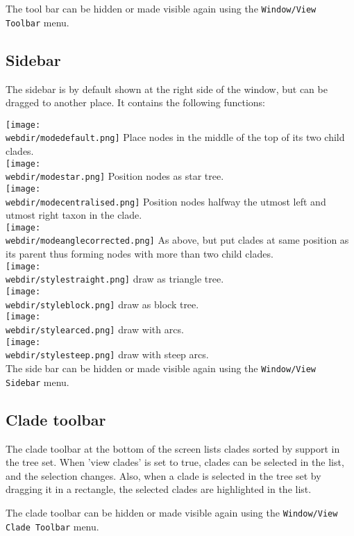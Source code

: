 \documentclass{article}
\def\webdir{/Users/remco/research/DensiTree/web}
\begin{document}
The tool bar can be hidden or made visible again using the {\tt Window/View Toolbar} menu.

\subsection{Sidebar}
The sidebar is by default shown at the right side of the window, but can be dragged to another place.
It contains the following functions:

\texttt{[image: \\webdir/modedefault.png]} Place nodes in the middle of the top of its two child clades.\\
\texttt{[image: \\webdir/modestar.png]} Position nodes as star tree.\\
\texttt{[image: \\webdir/modecentralised.png]} Position nodes halfway the utmost left and utmost right taxon in the clade.\\
\texttt{[image: \\webdir/modeanglecorrected.png]} As above, but put clades at same position as its parent thus forming nodes with more than two child clades.\\

\texttt{[image: \\webdir/stylestraight.png]} draw as triangle tree.\\
\texttt{[image: \\webdir/styleblock.png]} draw as block tree.\\
\texttt{[image: \\webdir/stylearced.png]} draw with arcs.\\
\texttt{[image: \\webdir/stylesteep.png]} draw with steep arcs.\\

The side bar can be hidden or made visible again using the {\tt Window/View Sidebar} menu.



\subsection{Clade toolbar}

The clade toolbar at the bottom of the screen lists clades sorted by support in the tree set.
When 'view clades' is set to true, clades can be selected in the list, and the
selection changes. Also, when a clade is selected in the tree set by dragging it
in a rectangle, the selected clades are highlighted in the list.

The clade toolbar can be hidden or made visible again using the {\tt Window/View Clade Toolbar} menu.
\end{document}
